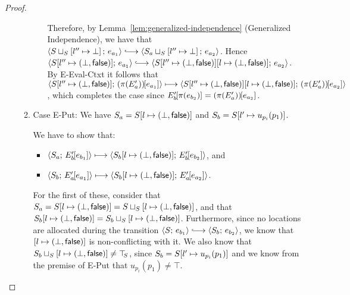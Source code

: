 \begin{proof}
\begin{enumerate}
\begin{enumerate}
\begin{itemize}

          Therefore, by Lemma~\ref{lem:generalized-independence}
          (Generalized Independence), we have that
          $\config{\lubstore{S}{\store{\storebindingRaw{l''}{\bot}}}}{e_{a_1}}
          \parstepsto
          \config{\lubstore{S_a}{\store{\storebindingRaw{l''}{\bot}}}}{e_{a_2}}$.
          Hence $\config{\extS{S}{l''}{\bot}{\frozenfalse}}{e_{a_1}} \parstepsto
          \config{\extS{\extS{S}{l''}{\bot}{\frozenfalse}}{l}{\bot}{\frozenfalse}}{e_{a_2}}$.
          By {\sc E-Eval-Ctxt} it follows that
          $\langle S[l'' \mapsto (\bot, \textsf{false})];\, (\pi(E'_a))\hspace{-1mm}\left[e_{a_1}\right] \rangle
          \longmapsto
          \langle S[l'' \mapsto (\bot, \textsf{false})][l \mapsto (\bot, \textsf{false})];\, (\pi(E'_a))\hspace{-1mm}\left[e_{a_2}\right] \rangle$,
          which completes the case since
          $E'_b\hspace{-1mm}\left[\pi(e_{b_2})\right] =
          (\pi(E'_a))\hspace{-1mm}\left[e_{a_2}\right]$.


      \end{itemize}

    \item \label{slqc-new-put}Case {\sc E-Put}: We have $S_a =
      S[l \mapsto (\bot, \textsf{false})]$ and $S_b =
      S[l' \mapsto u_{p_i}(p_1)]$.

      We have to show that:
      \begin{itemize}
      \item $\langle S_a;\, E'_b\hspace{-1mm}\left[e_{b_1}\right] \rangle \longmapsto
        \langle S_b[l \mapsto (\bot, \textsf{false})];\, E'_b\hspace{-1mm}\left[e_{b_2}\right] \rangle$,
        and
      \item
        $\langle S_b;\, E'_a\hspace{-1mm}\left[e_{a_1}\right] \rangle \longmapsto
        \langle S_b[l \mapsto (\bot, \textsf{false})];\, E'_a\hspace{-1mm}\left[e_{a_2}\right] \rangle$.
      \end{itemize}

      For the first of these, consider that $S_a =
      S[l \mapsto (\bot, \textsf{false})] =
      S \sqcup_{S} \left[ l \mapsto (\bot, \textsf{false}) \right]$, and that
      $S_b[l \mapsto (\bot, \textsf{false})] =
      S_b \sqcup_{S} \left[ l \mapsto (\bot, \textsf{false}) \right]$.
      Furthermore, since no locations are allocated during the
      transition $\config{S}{e_{b_1}} \parstepsto
      \config{S_b}{e_{b_2}}$, we know that
      $\left[ l \mapsto (\bot, \textsf{false}) \right]$ is non-conflicting with it.
      We also know that
      $S_b \sqcup_{S} \left[ l \mapsto (\bot, \textsf{false}) \right] \neq \top\hspace{-0.85mm}_{S}$,
      since $S_b = S[l' \mapsto u_{p_i}(p_1)]$ and we know
      from the premise of {\sc E-Put} that $u_{p_i}(p_1) \neq
      \top$.


\end{enumerate}
\end{enumerate}
\end{proof}
